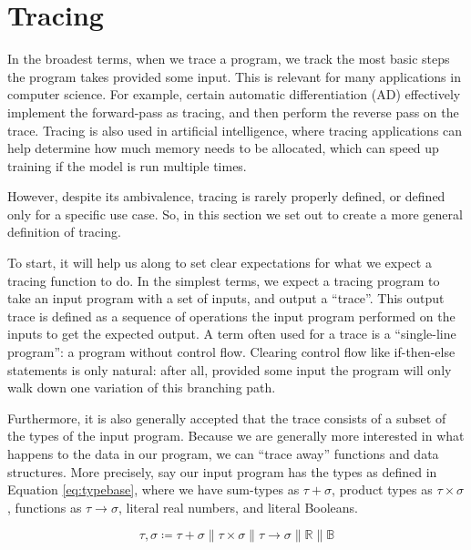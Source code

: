 \section{Tracing} \label{sec:tracing}
    In the broadest terms, when we trace a program, we track the most basic steps the program takes provided some input.
    This is relevant for many applications in computer science.
    For example, certain automatic differentiation (AD) effectively implement the forward-pass as tracing, and then perform the reverse pass on the trace.
    Tracing is also used in artificial intelligence, where tracing applications can help determine how much memory needs to be allocated, which can speed up training if the model is run multiple times.

    However, despite its ambivalence, tracing is rarely properly defined, or defined only for a specific use case.
    So, in this section we set out to create a more general definition of tracing.
    
    To start, it will help us along to set clear expectations for what we expect a tracing function to do.
    In the simplest terms, we expect a tracing program to take an input program with a set of inputs, and output a ``trace''.
    This output trace is defined as a sequence of operations the input program performed on the inputs to get the expected output.
    A term often used for a trace is a ``single-line program'': a program without control flow.
    Clearing control flow like if-then-else statements is only natural: after all, provided some input the program will only walk down one variation of this branching path.

    Furthermore, it is also generally accepted that the trace consists of a subset of the types of the input program.
    Because we are generally more interested in what happens to the data in our program, we can ``trace away'' functions and data structures.
    More precisely, say our input program has the types as defined in Equation \ref{eq:typebase}, where we have sum-types as $\tau+\sigma$, product types as $\tau\times\sigma$, functions as $\tau\to\sigma$, literal real numbers, and literal Booleans.

    \begin{equation}
        \label{eq:typebase}
        \tau,\sigma\coloneqq\tau+\sigma\|\tau\times\sigma\|\tau\to\sigma\|\mathbb{R}\|\mathbb{B}
    \end{equation}

